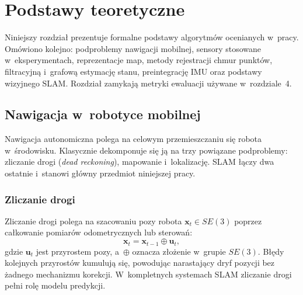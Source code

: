 


\chapter{Podstawy teoretyczne}

Niniejszy rozdział prezentuje formalne podstawy algorytmów ocenianych w~pracy.
Omówiono kolejno: podproblemy nawigacji mobilnej, sensory stosowane w~eksperymentach,
reprezentacje map, metody rejestracji chmur punktów, filtracyjną i~grafową
estymację stanu, preintegrację IMU oraz podstawy wizyjnego SLAM.
Rozdział zamykają metryki ewaluacji używane w~rozdziale~4.

\section{Nawigacja w~robotyce mobilnej}

Nawigacja autonomiczna polega na celowym przemieszczaniu się robota w~środowisku.
Klasycznie dekomponuje się ją na trzy powiązane podproblemy: zliczanie drogi
(\textit{dead reckoning}), mapowanie i~lokalizację.
SLAM łączy dwa ostatnie i~stanowi główny przedmiot niniejszej pracy.

\subsection{Zliczanie drogi}

Zliczanie drogi polega na szacowaniu pozy robota $\mathbf{x}_t \in SE(3)$
poprzez całkowanie pomiarów odometrycznych lub sterowań:
\begin{equation}
    \mathbf{x}_t = \mathbf{x}_{t-1} \oplus \mathbf{u}_t,
\end{equation}
gdzie $\mathbf{u}_t$ jest przyrostem pozy, a~$\oplus$ oznacza złożenie
w~grupie $SE(3)$.
Błędy kolejnych przyrostów kumulują się, powodując narastający dryf pozycji
bez żadnego mechanizmu korekcji.
W~kompletnych systemach SLAM zliczanie drogi pełni rolę modelu predykcji.

